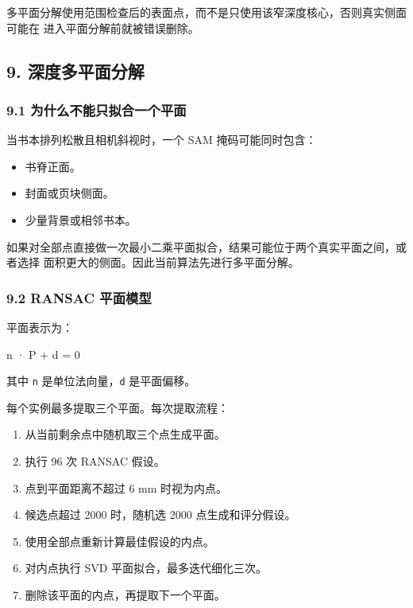 \documentclass[
  chinese,
  11pt,
  a4paper,
]{article}
\newenvironment{Shaded}{\begin{snugshade}}{\end{snugshade}}
\newcommand{\NormalTok}[1]{#1}
\providecommand{\tightlist}{%
  \setlength{\itemsep}{0pt}\setlength{\parskip}{0pt}}
\begin{document}
多平面分解使用范围检查后的表面点，而不是只使用该窄深度核心，否则真实侧面可能在
进入平面分解前就被错误删除。

\subsection{9.
深度多平面分解}\label{9-ux6df1ux5ea6ux591aux5e73ux9762ux5206ux89e3}

\subsubsection{9.1
为什么不能只拟合一个平面}\label{91-ux4e3aux4ec0ux4e48ux4e0dux80fdux53eaux62dfux5408ux4e00ux4e2aux5e73ux9762}

当书本排列松散且相机斜视时，一个 SAM 掩码可能同时包含：

\begin{itemize}
\tightlist
\item
  书脊正面。
\item
  封面或页块侧面。
\item
  少量背景或相邻书本。
\end{itemize}

如果对全部点直接做一次最小二乘平面拟合，结果可能位于两个真实平面之间，或者选择
面积更大的侧面。因此当前算法先进行多平面分解。

\subsubsection{9.2 RANSAC
平面模型}\label{92-ransac-ux5e73ux9762ux6a21ux578b}

平面表示为：

\begin{Shaded}
\begin{Highlighting}[]
\NormalTok{n · P + d = 0}
\end{Highlighting}
\end{Shaded}

其中 \texttt{n} 是单位法向量，\texttt{d} 是平面偏移。

每个实例最多提取三个平面。每次提取流程：

\begin{enumerate}
\def\labelenumi{\arabic{enumi}.}
\tightlist
\item
  从当前剩余点中随机取三个点生成平面。
\item
  执行 96 次 RANSAC 假设。
\item
  点到平面距离不超过 6 mm 时视为内点。
\item
  候选点超过 2000 时，随机选 2000 点生成和评分假设。
\item
  使用全部点重新计算最佳假设的内点。
\item
  对内点执行 SVD 平面拟合，最多迭代细化三次。
\item
  删除该平面的内点，再提取下一个平面。
\end{enumerate}
\end{document}
